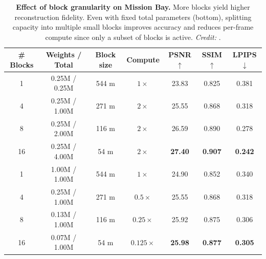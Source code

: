 \begin{enrichment}
\begin{enrichment}
        \begin{table}[H]
            \centering
            \small
            \setlength{\tabcolsep}{6pt}
            \begin{tabular}{|c|c|c|c||c|c|c|}
                \hline
                \# Blocks & Weights / Total & Block size & Compute & PSNR$\uparrow$ & SSIM$\uparrow$ & LPIPS$\downarrow$ \\
                \hline\hline
                1  & 0.25M / 0.25M & 544 m & $1\times$     & 23.83 & 0.825 & 0.381 \\
                4  & 0.25M / 1.00M & 271 m & $2\times$     & 25.55 & 0.868 & 0.318 \\
                8  & 0.25M / 2.00M & 116 m & $2\times$     & 26.59 & 0.890 & 0.278 \\
                16 & 0.25M / 4.00M & 54 m  & $2\times$     & \textbf{27.40} & \textbf{0.907} & \textbf{0.242} \\
                \hline
                1  & 1.00M / 1.00M & 544 m & $1\times$     & 24.90 & 0.852 & 0.340 \\
                4  & 0.25M / 1.00M & 271 m & $0.5\times$   & 25.55 & 0.868 & 0.318 \\
                8  & 0.13M / 1.00M & 116 m & $0.25\times$  & 25.92 & 0.875 & 0.306 \\
                16 & 0.07M / 1.00M & 54 m  & $0.125\times$ & \textbf{25.98} & \textbf{0.877} & \textbf{0.305} \\
                \hline
            \end{tabular}
            \caption{\textbf{Effect of block granularity on Mission Bay.} More blocks yield higher reconstruction fidelity. Even with fixed total parameters (bottom), splitting capacity into multiple small blocks improves accuracy and reduces per-frame compute since only a subset of blocks is active. 
            \emph{Credit:} \cite{barron2022_mipnerf360}.}
            \label{tab:chapter23_blocknerf_blocks}
        \end{table}
        

\end{enrichment}
\end{enrichment}
